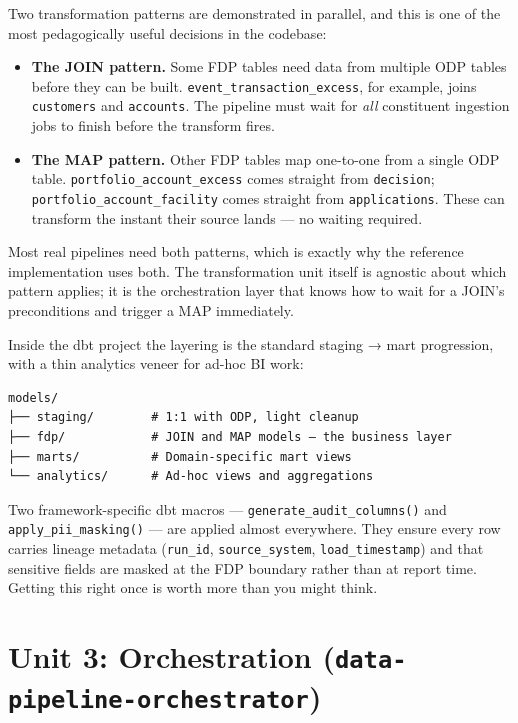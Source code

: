 \documentclass[
  11pt,
  british,
  oneside]{book}
\providecommand{\tightlist}{%
  \setlength{\itemsep}{0pt}\setlength{\parskip}{0pt}}
\begin{document}
Two transformation patterns are demonstrated in parallel, and this is
one of the most pedagogically useful decisions in the codebase:

\begin{itemize}
\tightlist
\item
  \textbf{The JOIN pattern.} Some FDP tables need data from multiple ODP
  tables before they can be built. \texttt{event\_transaction\_excess},
  for example, joins \texttt{customers} and \texttt{accounts}. The
  pipeline must wait for \emph{all} constituent ingestion jobs to finish
  before the transform fires.
\item
  \textbf{The MAP pattern.} Other FDP tables map one-to-one from a
  single ODP table. \texttt{portfolio\_account\_excess} comes straight
  from \texttt{decision}; \texttt{portfolio\_account\_facility} comes
  straight from \texttt{applications}. These can transform the instant
  their source lands --- no waiting required.
\end{itemize}

Most real pipelines need both patterns, which is exactly why the
reference implementation uses both. The transformation unit itself is
agnostic about which pattern applies; it is the orchestration layer that
knows how to wait for a JOIN's preconditions and trigger a MAP
immediately.

Inside the dbt project the layering is the standard staging → mart
progression, with a thin analytics veneer for ad-hoc BI work:

\begin{verbatim}
models/
├── staging/        # 1:1 with ODP, light cleanup
├── fdp/            # JOIN and MAP models — the business layer
├── marts/          # Domain-specific mart views
└── analytics/      # Ad-hoc views and aggregations
\end{verbatim}

Two framework-specific dbt macros ---
\texttt{generate\_audit\_columns()} and \texttt{apply\_pii\_masking()}
--- are applied almost everywhere. They ensure every row carries lineage
metadata (\texttt{run\_id}, \texttt{source\_system},
\texttt{load\_timestamp}) and that sensitive fields are masked at the
FDP boundary rather than at report time. Getting this right once is
worth more than you might think.

\hypertarget{unit-3-orchestration-data-pipeline-orchestrator}{%
\section{\texorpdfstring{Unit 3: Orchestration
(\texttt{data-pipeline-orchestrator})}{Unit 3: Orchestration (data-pipeline-orchestrator)}}\label{unit-3-orchestration-data-pipeline-orchestrator}}
\end{document}
